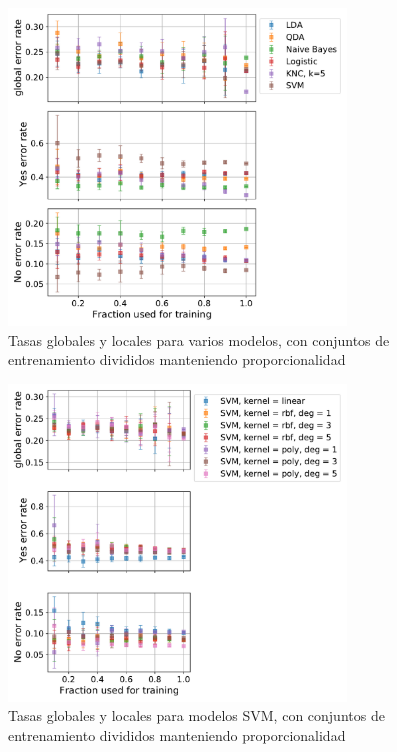 \documentclass[11pt]{article}
\begin{document}
\begin{figure}[H]
    \centering
    \includegraphics[width = 0.8\textwidth]{1-gen-eq-sizeDependence.pdf}
    \caption{Tasas globales y locales para varios modelos, con conjuntos de entrenamiento divididos manteniendo proporcionalidad}
    \label{1-gen-eq-sizeDependence}
\end{figure}
\begin{figure}[H]
    \centering
    \includegraphics[width = 0.8\textwidth]{1-svm-eq-sizeDependence.pdf}
    \caption{Tasas globales y locales para modelos SVM, con conjuntos de entrenamiento divididos manteniendo proporcionalidad}
    \label{1-svm-eq-sizeDependence}
\end{figure}
\end{document}
